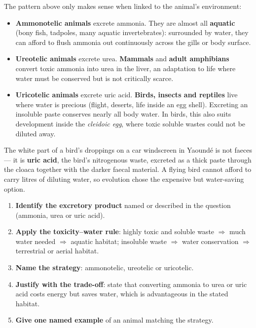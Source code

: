 \documentclass[11pt]{article}
\newcommand{\cle}[1]{{\popxbold\color{popdark}#1}}
\begin{document}
The pattern above only makes sense when linked to the animal's environment:

\begin{itemize}
\item \textbf{Ammonotelic animals} excrete \cle{ammonia}. They are almost all \textbf{aquatic} (bony fish, tadpoles, many aquatic invertebrates): surrounded by water, they can afford to flush ammonia out continuously across the gills or body surface.
\item \textbf{Ureotelic animals} excrete \cle{urea}. \textbf{Mammals} and \textbf{adult amphibians} convert toxic ammonia into urea in the liver, an adaptation to life where water must be conserved but is not critically scarce.
\item \textbf{Uricotelic animals} excrete \cle{uric acid}. \textbf{Birds, insects and reptiles} live where water is precious (flight, deserts, life inside an egg shell). Excreting an insoluble paste conserves nearly all body water. In birds, this also suits development inside the \emph{cleidoic egg}, where toxic soluble wastes could not be diluted away.
\end{itemize}

\begin{savaistu}
The white part of a bird's droppings on a car windscreen in Yaound\'e is not faeces — it is \textbf{uric acid}, the bird's nitrogenous waste, excreted as a thick paste through the cloaca together with the darker faecal material. A flying bird cannot afford to carry litres of diluting water, so evolution chose the expensive but water-saving option.
\end{savaistu}

\begin{methode}
\begin{enumerate}
\item \textbf{Identify the excretory product} named or described in the question (ammonia, urea or uric acid).
\item \textbf{Apply the toxicity--water rule}: highly toxic and soluble waste $\Rightarrow$ much water needed $\Rightarrow$ aquatic habitat; insoluble waste $\Rightarrow$ water conservation $\Rightarrow$ terrestrial or aerial habitat.
\item \textbf{Name the strategy}: ammonotelic, ureotelic or uricotelic.
\item \textbf{Justify with the trade-off}: state that converting ammonia to urea or uric acid costs energy but saves water, which is advantageous in the stated habitat.
\item \textbf{Give one named example} of an animal matching the strategy.
\end{enumerate}
\end{methode}
\end{document}
